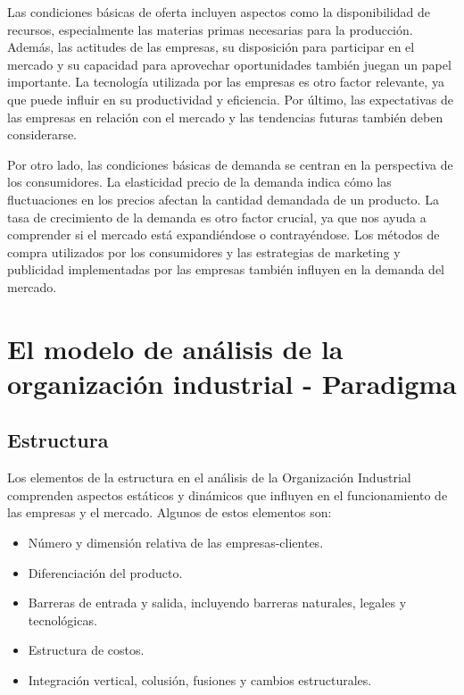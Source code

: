 \documentclass[
  doc,
  floatsintext,
  longtable,
  a4paper,
  nolmodern,
  notxfonts,
  notimes,
  colorlinks=true,linkcolor=blue,citecolor=blue,urlcolor=blue]{apa7}
\providecommand{\tightlist}{%
  \setlength{\itemsep}{0pt}\setlength{\parskip}{0pt}}
\begin{document}
Las condiciones básicas de oferta incluyen aspectos como la
disponibilidad de recursos, especialmente las materias primas necesarias
para la producción. Además, las actitudes de las empresas, su
disposición para participar en el mercado y su capacidad para aprovechar
oportunidades también juegan un papel importante. La tecnología
utilizada por las empresas es otro factor relevante, ya que puede
influir en su productividad y eficiencia. Por último, las expectativas
de las empresas en relación con el mercado y las tendencias futuras
también deben considerarse.

Por otro lado, las condiciones básicas de demanda se centran en la
perspectiva de los consumidores. La elasticidad precio de la demanda
indica cómo las fluctuaciones en los precios afectan la cantidad
demandada de un producto. La tasa de crecimiento de la demanda es otro
factor crucial, ya que nos ayuda a comprender si el mercado está
expandiéndose o contrayéndose. Los métodos de compra utilizados por los
consumidores y las estrategias de marketing y publicidad implementadas
por las empresas también influyen en la demanda del mercado.

\section{El modelo de análisis de la organización industrial -
Paradigma}\label{el-modelo-de-anuxe1lisis-de-la-organizaciuxf3n-industrial---paradigma}

\subsection{Estructura}\label{estructura}

Los elementos de la estructura en el análisis de la Organización
Industrial comprenden aspectos estáticos y dinámicos que influyen en el
funcionamiento de las empresas y el mercado. Algunos de estos elementos
son:

\begin{itemize}
\tightlist
\item
  Número y dimensión relativa de las empresas-clientes.
\item
  Diferenciación del producto.
\item
  Barreras de entrada y salida, incluyendo barreras naturales, legales y
  tecnológicas.
\item
  Estructura de costos.
\item
  Integración vertical, colusión, fusiones y cambios estructurales.
\end{itemize}
\end{document}
